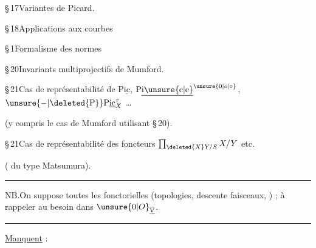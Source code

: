 \S\,17\quad Variantes de Picard.

\S\,18\quad Applications aux courbes

\S\,1\quad Formalisme des normes

\S\,20\quad Invariants multiprojectifs de Mumford.


\S\,21\quad Cas de représentabilité de $\mathrm P\underline{\mathrm{ic}}$, $\mathrm P\underline{\mathrm i\unsure{\mathrm c|\mathrm e}}^{\unsure{0|o|\circ}}$, $\unsure{-|\deleted{\mathrm P}}\mathrm P\underline{\mathrm{ic}}_{X}^{\tau}$ \ldots

(y compris le cas de Mumford utilisant \S\,20).

\S\,21\quad Cas de représentabilité des foncteurs $\prod_{\deleted{X}Y/S}X/Y$ etc.

( du type Matsumura).

\noindent\rule{\linewidth}{.3pt}

NB.\quad On suppose  toutes les  fonctorielles (topologies, descente faisceaux, ) ; à rappeler au besoin dans $\unsure{0|O}_{\underline{\overline{\mathrm V}}}$.

\noindent\rule{\linewidth}{.3pt}

\uline{Manquent} :

